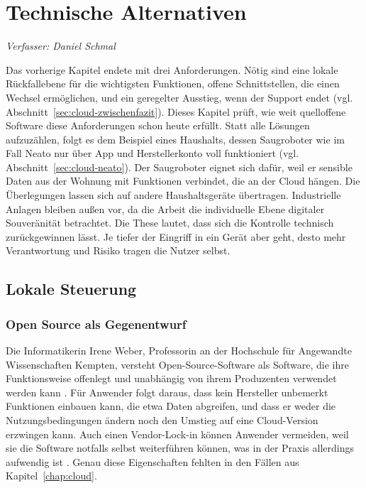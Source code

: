 \chapter{Technische Alternativen}\label{chap:lokal}
\noindent\textit{Verfasser: Daniel Schmal}
\medskip

Das vorherige Kapitel endete mit drei Anforderungen. Nötig sind eine lokale
Rückfallebene für die wichtigsten Funktionen, offene Schnittstellen, die einen
Wechsel ermöglichen, und ein geregelter Ausstieg, wenn der Support endet
(vgl. Abschnitt~\ref{sec:cloud-zwischenfazit}). Dieses Kapitel prüft, wie weit
quelloffene Software diese Anforderungen schon heute erfüllt. Statt alle
Lösungen aufzuzählen, folgt es dem Beispiel eines Haushalts, dessen
Saugroboter wie im Fall Neato nur über App und Herstellerkonto voll
funktioniert (vgl. Abschnitt~\ref{sec:cloud-neato}). Der Saugroboter eignet
sich dafür, weil er sensible Daten aus der Wohnung mit Funktionen verbindet,
die an der Cloud hängen. Die Überlegungen lassen sich auf andere
Haushaltsgeräte übertragen. Industrielle Anlagen bleiben außen vor, da die
Arbeit die individuelle Ebene digitaler Souveränität betrachtet. Die These
lautet, dass sich die Kontrolle technisch zurückgewinnen lässt. Je tiefer der
Eingriff in ein Gerät aber geht, desto mehr Verantwortung und Risiko tragen die
Nutzer selbst.

\section{Lokale Steuerung}\label{sec:lokal-steuerung}

\subsection{Open Source als Gegenentwurf}\label{sec:lokal-opensource}

Die Informatikerin Irene Weber, Professorin an der Hochschule für Angewandte
Wissenschaften Kempten, versteht Open-Source-Software als Software, die ihre
Funktionsweise offenlegt und unabhängig von ihrem Produzenten verwendet werden
kann \cite[S.~1]{weber:2026}. Für Anwender folgt daraus, dass kein Hersteller
unbemerkt Funktionen einbauen kann, die etwa Daten abgreifen, und dass er
weder die Nutzungsbedingungen ändern noch den Umstieg auf eine Cloud-Version
erzwingen kann. Auch einen Vendor-Lock-in können Anwender vermeiden, weil sie
die Software notfalls selbst weiterführen können, was in der Praxis allerdings
aufwendig ist \cite[S.~47\,f.]{weber:2026}. Genau diese Eigenschaften fehlten
in den Fällen aus Kapitel~\ref{chap:cloud}.

